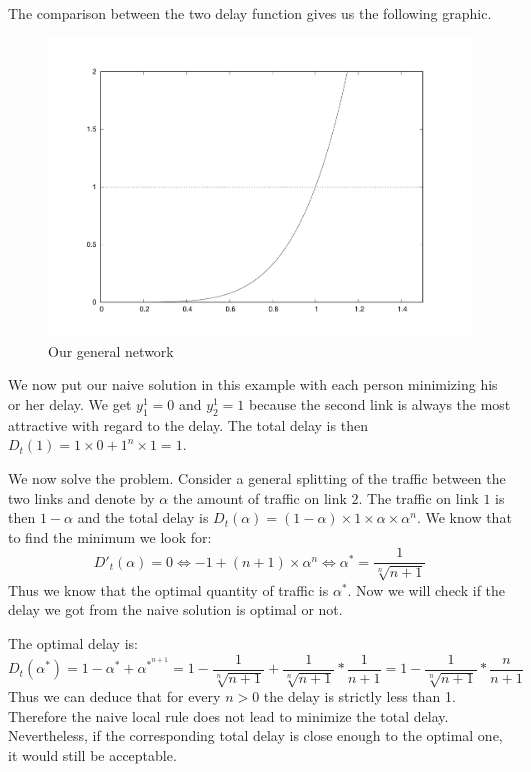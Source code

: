 The comparison between the two delay function gives us the following graphic.

\begin{figure}[h]
\centering
\includegraphics[scale=0.2]{exo2.pdf}
\caption{Our general network}
\end{figure}

We now put our naive solution in this example with each person minimizing his or her delay. We get $y^1_1 = 0$ and $y^1_2 = 1$ because the second link is always the most attractive with regard to the delay. The total delay is then $D_t(1) = 1 \times 0 + 1^n \times 1 = 1$.

We now solve the problem. Consider a general splitting of the traffic between the two links and denote by $\alpha$ the amount of traffic on link $2$. The traffic on link $1$ is then $1-\alpha$ and the total delay is  $D_t(\alpha ) = (1 - \alpha ) \times 1 \times \alpha \times \alpha ^n$. We know that to find the minimum we look for: $$D'_t(\alpha ) = 0 \iff -1 + (n + 1) \times \alpha ^n \iff \alpha ^* = \frac{1}{{\sqrt[n]{n+1}}}$$ Thus we know that the optimal quantity of traffic is $\alpha ^*$. Now we will check if the delay we got from the naive solution is optimal or not.

The optimal delay is: $$D_t(\alpha ^*) = 1 - \alpha ^* + \alpha ^{*^{n+1}} = 1 - \frac{1}{{\sqrt[n]{n+1}}} + \frac{1}{{\sqrt[n]{n+1}}} * \frac{1}{n+1} = 1 - \frac{1}{{\sqrt[n]{n+1}}} * \frac{n}{n+1}$$ Thus we can deduce that for every $ n > 0$ the delay is strictly less than 1. Therefore the naive local rule does not lead to minimize the total delay. Nevertheless,  if the corresponding total delay is close enough to the optimal one, it would still be acceptable.

